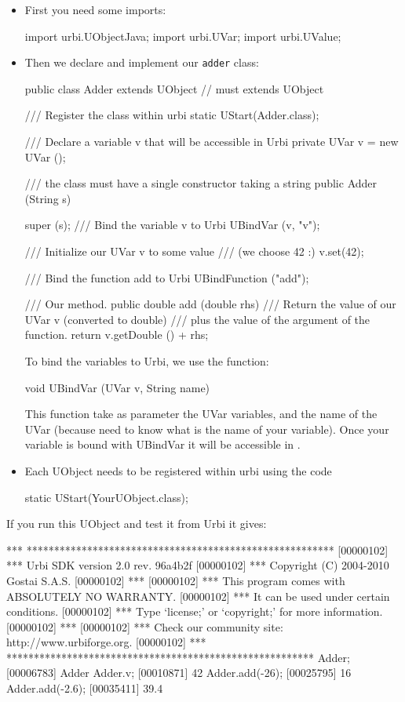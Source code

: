 \begin{itemize}
\item First you need some imports:

\begin{java}
import urbi.UObjectJava;
import urbi.UVar;
import urbi.UValue;
\end{java}

\item Then we declare and implement our \lstinline{adder} class:
\begin{java}
public class Adder extends UObject // must extends UObject
{
  /// Register the class within urbi
  static { UStart(Adder.class); }

  /// Declare a variable v that will be accessible in Urbi
  private UVar v = new UVar ();

  /// the class must have a single constructor taking a string
  public Adder (String s)
  {
    super (s);
    /// Bind the variable v to Urbi
    UBindVar (v, "v");

    /// Initialize our UVar v to some value
    /// (we choose 42 :)
    v.set(42);

    /// Bind the function add to Urbi
    UBindFunction ("add");
  }

  /// Our method.
  public double add (double rhs)
  {
    /// Return the value of our UVar v (converted to double)
    /// plus the value of the argument of the function.
    return v.getDouble () + rhs;
  }
}
\end{java}

To bind the variables to Urbi, we use the function:
\begin{cxx}
void UBindVar (UVar v, String name)
\end{cxx}

This function take as parameter the UVar variables, and the name of the
UVar (because \urbi need to know what is the name of your variable).
Once your variable is bound with UBindVar it will be accessible in \urbi.

\item Each UObject needs to be registered within urbi using the code
\begin{cxx}
static { UStart(YourUObject.class); }
\end{cxx}
\end{itemize}

If you run this UObject and test it from Urbi it gives:

\begin{urbiunchecked}
[00000102] *** ********************************************************
[00000102] *** Urbi SDK version 2.0 rev. 96a4b2f
[00000102] *** Copyright (C) 2004-2010 Gostai S.A.S.
[00000102] ***
[00000102] *** This program comes with ABSOLUTELY NO WARRANTY.
[00000102] *** It can be used under certain conditions.
[00000102] *** Type `license;' or `copyright;' for more information.
[00000102] ***
[00000102] *** Check our community site: http://www.urbiforge.org.
[00000102] *** ********************************************************
Adder;
[00006783] Adder
Adder.v;
[00010871] 42
Adder.add(-26);
[00025795] 16
Adder.add(-2.6);
[00035411] 39.4
\end{urbiunchecked}


